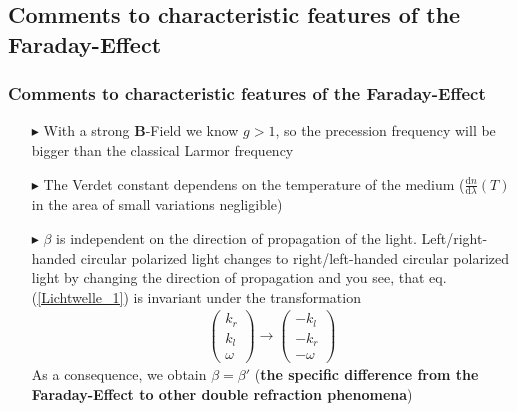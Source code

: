 \documentclass[10pt,a4paper]{beamer}
\begin{document}
\begin{frame}
\subsection{Comments to characteristic features of the Faraday-Effect}
\frametitle{Comments to characteristic features of the Faraday-Effect}
\begin{itemize}
\item[$\blacktriangleright$] With a strong \textbf{B}-Field we know $g > 1$, so the precession frequency will be bigger than the classical Larmor frequency \newline \pause
\item[$\blacktriangleright$] The Verdet constant dependens on the temperature of the medium ($\frac{\text{d} n}{\text{d} \lambda}(T)$ in the area of small variations negligible) \newline \pause
\item[$\blacktriangleright$] $\beta$ is independent on the direction of propagation of the light.\newline \newline \pause
Left/right-handed circular polarized light changes to right/left-handed circular polarized light by changing the direction of propagation and
you see, that eq. (\ref{Lichtwelle_1}) is invariant under the transformation 
\begin{align}
\begin{pmatrix}
k_r \\
k_l \\
\omega
\end{pmatrix} \rightarrow 
\begin{pmatrix}
-k_l\\
-k_r\\
-\omega
\end{pmatrix}
\end{align}\pause
As a consequence, we obtain $\beta = \beta'$ \newline(\textbf{the specific difference from the Faraday-Effect to other double refraction phenomena})
\end{itemize}
\end{frame}
\end{document}
